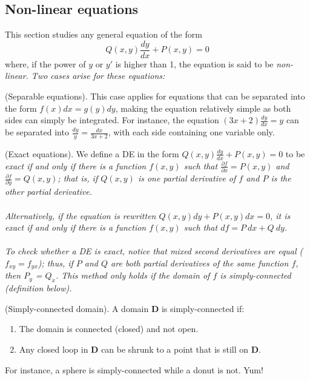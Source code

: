 \documentclass{article}
\begin{document}
\subsection{Non-linear equations}
This section studies any general equation of the form
\begin{equation*}
Q(x, y)\frac{dy}{dx} + P(x,y) = 0
\end{equation*}
where, if the power of $y$ or $y'$ is higher than 1, the equation is said to be \it{non-linear}\normalfont. Two cases arise for these equations:
\begin{definition}
(Separable equations). This case applies for equations that can be separated into the form $f(x) dx = g(y) dy$, making the equation relatively simple as both sides can simply be integrated. For instance, the equation $(3x+2)\frac{dy}{dx} = y$ can be separated into $\frac{dy}{y} = \frac{dx}{3x+2}$, with each side containing one variable only.
\end{definition}
\begin{definition}
(Exact equations). We define a DE in the form $Q(x,y)\frac{dy}{dx} + P(x,y) = 0$ to be \it exact \normalfont if and only if there is a function $f(x,y)$ such that $\frac{\partial f}{\partial x} = P(x,y)$ and $\frac{\partial f}{\partial y} = Q(x,y)$; that is, if $Q(x,y)$ is one partial derivative of $f$ and $P$ is the other partial derivative.\\ \\
Alternatively, if the equation is rewritten $Q(x,y) dy + P(x,y) dx = 0$, it is exact if and only if there is a function $f(x,y)$ such that $df = P\ dx + Q\ dy$. \\ \\
To check whether a DE is exact, notice that mixed second derivatives are equal ($f_{xy} = f_{yx}$); thus, if $P$ and $Q$ are both partial derivatives of the same function $f$, then $P_y$ = $Q_x$. This method only holds if the domain of $f$ is \it simply-connected \normalfont (definition below). 
\end{definition}
\begin{definition}
    (Simply-connected domain). A domain $\mathbf{D}$ is simply-connected if:
    \begin{enumerate}
        \item The domain is connected (closed) and not open.
        \item Any closed loop in $\mathbf{D}$ can be shrunk to a point that is still on $\mathbf{D}$.
    \end{enumerate}
    For instance, a sphere is simply-connected while a donut is not. Yum!
\end{definition}
\end{document}
